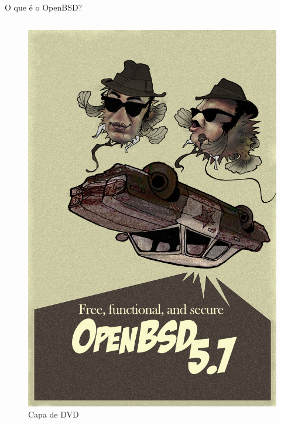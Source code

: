 \documentclass[9pt,xcolor=table]{beamer}
\begin{document}
\begin{frame}{O que é o OpenBSD?}
\begin{columns}
\begin{column}{0.3\textwidth}
\begin{figure}
            \includegraphics[width=\textwidth]{imagens/openbsd-poster.jpg}
            \caption{Capa de DVD}
            \end{figure}
        \end{column}
    \end{columns}
\end{frame}
\end{document}
